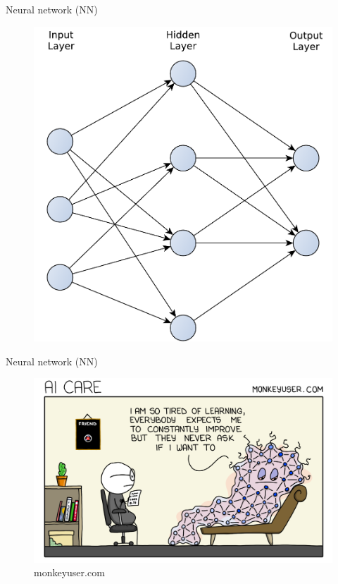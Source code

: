 \begin{frame}{Neural network (NN)}
  \begin{figure}
	\includegraphics[width=\linewidth,height=0.75\textheight,keepaspectratio]{images/neural_network.pdf}
  \end{figure}
\end{frame}

\begin{frame}{Neural network (NN)}
  \begin{figure}
	\includegraphics[width=\linewidth,height=\textheight,keepaspectratio]{images/monkeyuser_ai_care.png}
	\caption{monkeyuser.com}
  \end{figure}
\end{frame}

